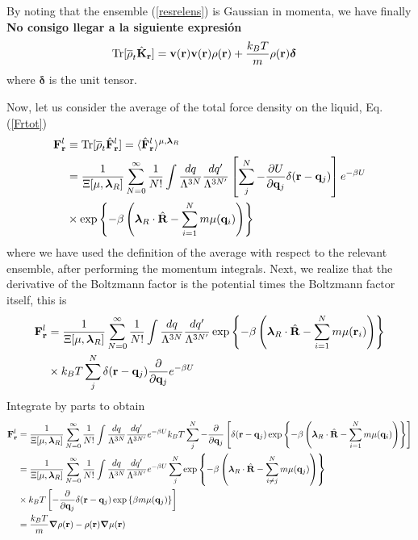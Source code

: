 \documentclass[b5paper,openright,11pt]{book}
\newcommand{\Note}[1]{{\bf \color{red}#1}}    %
\begin{document}
By noting that the ensemble (\ref{resrelens}) is Gaussian in momenta, we have finally \Note{No consigo llegar a la siguiente expresión}
\begin{align}
  {\rm Tr}[\overline{\rho}_t \hat{{\bf K}}_{\bf r}] &=
{\bf v}({\bf r}){\bf v}({\bf r}){\rho}({\bf r})+\frac{k_BT}{m}\rho({\bf r})\boldsymbol{\delta}
\label{api}
\end{align}
where $\boldsymbol{\delta}$ is the unit  tensor.  

Now, let us consider the average of the total force density on the liquid, Eq. (\ref{Frtot})
\begin{align}
{\bf F}^l_{\bf r} &\equiv{\rm Tr}[\overline{\rho}_t \hat{\bf F}^l_{\bf r}] =
 \langle \hat{\bf F}^l_{\bf r}\rangle^{\mu,\boldsymbol{\lambda}_R}
\nonumber\\
&=
\frac{1}{\Xi[\mu,\boldsymbol{\lambda}_R]}
 \sum_{N=0}^\infty \frac{1}{N!}
\int \frac{dq}{\Lambda^{3N}}\frac{dq'}{\Lambda^{3N'}}
\left[\sum^{N}_{j}-\frac{\partial U}{\partial {\bf q}_{j}}\delta({\bf r}-{\bf q}_j)\right]
e^{-\beta U}
\nonumber\\
&\times \exp\left\{-\beta  \left( \boldsymbol{\lambda}_R\cdot\hat{\bf R}
-\sum_{i=1}^N m\mu({\bf q}_i)\right)\right\}
\end{align}
where we have  used the definition of the average  with respect to the
relevant ensemble,  after performing the momentum  integrals. Next, we
realize that the  derivative of the Boltzmann factor  is the potential
times the Boltzmann factor itself, this is
\begin{align}
{\bf F}^l_{\bf r}&=
\frac{1}{\Xi[\mu,\boldsymbol{\lambda}_R]}
 \sum_{N=0}^\infty \frac{1}{N!}
\int \frac{dq}{\Lambda^{3N}}\frac{dq'}{\Lambda^{3N'}}
\exp\left\{-\beta  \left(\boldsymbol{\lambda}_R\cdot\hat{\bf R}
-\sum_{i=1}^N m\mu({\bf   r}_i)\right)\right\}
\nonumber\\
&\times k_BT\sum^{N}_{j}\delta({\bf r}-{\bf q}_j)\frac{\partial }{\partial {\bf q}_{j}}e^{-\beta U}
\end{align}
Integrate by parts to obtain
\begin{align}
{\bf F}^l_{\bf r}&=
\frac{1}{\Xi[\mu,\boldsymbol{\lambda}_R]}
 \sum_{N=0}^\infty \frac{1}{N!}
\int \frac{dq}{\Lambda^{3N}}\frac{dq'}{\Lambda^{3N'}}
e^{-\beta U}
k_BT\sum^{N}_{j}-\frac{\partial }{\partial {\bf q}_{j}}\left[\delta({\bf r}-{\bf q}_j)
\exp\left\{-\beta  \left( \boldsymbol{\lambda}_R\cdot\hat{\bf R}
-\sum_{i=1}^N m\mu({\bf q}_i)\right)\right\}\right]
\nonumber\\
&=
\frac{1}{\Xi[\mu,\boldsymbol{\lambda}_R]}
 \sum_{N=0}^\infty \frac{1}{N!}
\int \frac{dq}{\Lambda^{3N}}\frac{dq'}{\Lambda^{3N'}}
e^{-\beta U}
\sum^{N}_{j}\exp\left\{-\beta  \left( \boldsymbol{\lambda}_R\cdot\hat{\bf R}
-\sum_{i\neq j}^N m\mu({\bf   q}_j)\right)\right\}
\nonumber\\
&\times k_BT\left[-\frac{\partial }{\partial {\bf q}_{j}}\delta({\bf r}-{\bf q}_j)
\exp\left\{\beta   m\mu({\bf   q}_j)\right\}\right]
\nonumber\\
&=\frac{k_BT}{m}\boldsymbol{\nabla} \rho({\bf r})
-\rho({\bf r})\boldsymbol{\nabla}\mu({\bf r})
\label{fllr}
\end{align}
\end{document}
